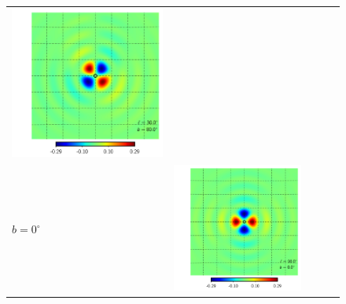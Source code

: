 \documentclass[a4paper,11pt]{article}
\begin{document}
\begin{figure}[t]
\begin{center}
\begin{tabular}{m{8ex}m{}m{}|m{}m{}}
\hspace{\kernelfigspace}\includegraphics[width=\kernelfigwidth]{qu2eb_iker_con_lat80_lon30.pdf} \\
$b=0^\circ$&
\hspace{\kernelfigspace}\includegraphics[width=\kernelfigwidth]{qu2eb_rker_rad_lat0_lon90.pdf} &

\end{tabular}
\end{center}
\end{figure}
\end{document}
